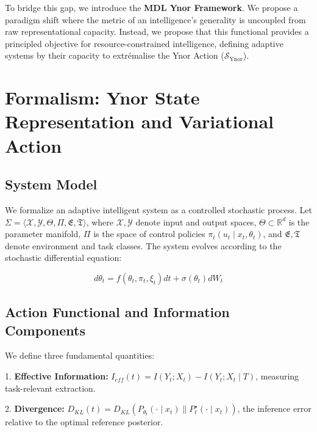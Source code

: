 \documentclass{article}
\begin{document}
To bridge this gap, we introduce the \textbf{MDL Ynor Framework}. We propose a paradigm shift where the metric of an intelligence's generality is uncoupled from raw representational capacity. Instead, we propose that this functional provides a principled objective for resource-constrained intelligence, defining adaptive systems by their capacity to extr\'emalise the Ynor Action ($\mathcal{S}_{\text{Ynor}}$).



\section{Formalism: Ynor State Representation and Variational Action}



\subsection{System Model}

We formalize an adaptive intelligent system as a controlled stochastic process. Let $\Sigma = \langle \mathcal{X}, \mathcal{Y}, \Theta, \Pi, \mathfrak{E}, \mathfrak{T} \rangle$, where $\mathcal{X}, \mathcal{Y}$ denote input and output spaces, $\Theta \subset \mathbb{R}^d$ is the parameter manifold, $\Pi$ is the space of control policies $\pi_t(u_t \mid x_t, \theta_t)$, and $\mathfrak{E}, \mathfrak{T}$ denote environment and task classes. The system evolves according to the stochastic differential equation:

\begin{equation}

d\theta_t = f(\theta_t, \pi_t, \xi_t) dt + \sigma(\theta_t) dW_t

\end{equation}



\subsection{Action Functional and Information Components}

We define three fundamental quantities:

1. \textbf{Effective Information:} $I_{eff}(t) = I(Y_t; X_t) - I(Y_t; X_t \mid T)$, measuring task-relevant extraction.

2. \textbf{Divergence:} $D_{KL}(t) = D_{KL}(P_{\theta_t}(\cdot \mid x_t) \parallel P_t^\star(\cdot \mid x_t))$, the inference error relative to the optimal reference posterior.
\end{document}
